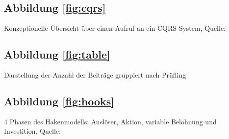 \subsection*{Abbildung \ref{fig:cqrs}}
Konzeptionelle Übersicht über einen Aufruf an ein CQRS System, Quelle: \cite{Fowler2011}

\subsection*{Abbildung \ref{fig:table}}
Darstellung der Anzahl der Beiträge gruppiert nach Prüfling

\subsection*{Abbildung \ref{fig:hooks}}
4 Phasen des Hakenmodells: Auslöser, Aktion, variable Belohnung und Investition, Quelle: \cite[S. 9]{Eyal2014}
